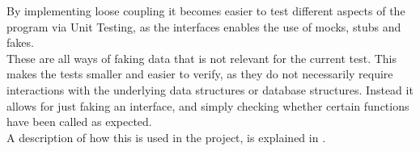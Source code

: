 By implementing loose coupling it becomes easier to test different aspects of the program via Unit Testing, as the interfaces enables the use of mocks, stubs and fakes. \\
These are all ways of faking data that is not relevant for the current test. This makes the tests smaller and easier to verify, as they do not necessarily require interactions with the underlying data structures or database structures. Instead it allows for just faking an interface, and simply checking whether certain functions have been called as expected. \\
A description of how this is used in the project, is explained in . \par
{}




\par
